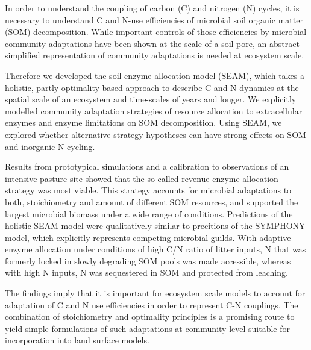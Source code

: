 In order to understand the coupling of carbon (C) and nitrogen (N) cycles, it is
necessary to understand C and N-use efficiencies of microbial soil organic
matter (SOM) decomposition. While important controls of those efficiencies by
microbial community adaptations have been shown at the scale of a soil pore, an
abstract simplified representation of community adaptations is needed at
ecosystem scale.

Therefore we developed the soil enzyme allocation model (SEAM), which takes a
holistic, partly optimality based approach to describe C and N dynamics at the
spatial scale of an ecosystem and time-scales of years and longer. We explicitly
modelled community adaptation strategies of resource allocation to extracellular
enzymes and enzyme limitations on SOM decomposition. Using SEAM, we explored
whether alternative strategy-hypotheses can have strong effects on SOM and
inorganic N cycling.

Results from prototypical simulations and a calibration to observations of an
intensive pasture site showed that the so-called revenue enzyme allocation
strategy was most viable. This strategy accounts for microbial adaptations to
both, stoichiometry and amount of different SOM resources, and supported the
largest microbial biomass under a wide range of conditions. Predictions of the
holistic SEAM model were qualitatively similar to precitions of the SYMPHONY
model, which explicitly represents competing microbial guilds. With adaptive enzyme
allocation under conditions of high C/N ratio of litter inputs, N that was
formerly locked in slowly degrading SOM pools was made accessible, whereas with
high N inputs, N was sequestered in SOM and protected from leaching.

The findings imply that it is important for ecosystem scale models to account
for adaptation of C and N use efficiencies in order to represent C-N couplings.
The combination of stoichiometry and optimality principles is a promising route
to yield simple formulations of such adaptations at community level suitable for
incorporation into land surface models.
